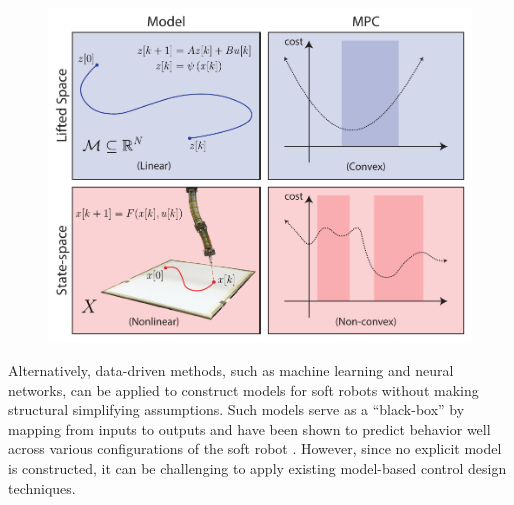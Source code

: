 \begin{figure}
    \centering
    \includegraphics[width=\linewidth]{figures/overview_v8.pdf}
    \caption{}
    \label{fig:overview}
\end{figure}

Alternatively, data-driven methods, such as machine learning and neural networks, can be applied to construct models for soft robots without making structural simplifying assumptions.
Such models serve as a ``black-box'' by mapping from inputs to outputs and have been shown to predict behavior well across various configurations of the soft robot  \cite{gillespie2018learning, thuruthel2018model}.
However, since no explicit model is constructed, it can be challenging to apply existing model-based control design techniques.

